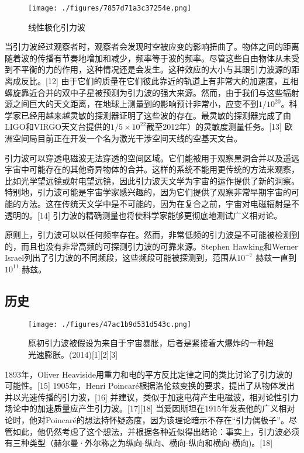 \begin{figure}[ht]
\centering
\texttt{[image: ./figures/7857d71a3c37254e.png]}
\caption{线性极化引力波} \label{fig_YLB_2}
\end{figure}

当引力波经过观察者时，观察者会发现时空被应变的影响扭曲了。物体之间的距离随着波的传播有节奏地增加和减少，频率等于波的频率。尽管这些自由物体从未受到不平衡的力的作用，这种情况还是会发生。这种效应的大小与其跟引力波源的距离成反比。[12] 由于它们的质量在它们彼此靠近的轨道上有非常大的加速度，互相螺旋靠近合并的双中子星被预测为引力波的强大来源。然而，由于我们与这些辐射源之间巨大的天文距离，在地球上测量到的影响预计非常小，应变不到$1/10^{20}$。科学家已经用越来越灵敏的探测器证明了这些波的存在。最灵敏的探测器完成了由LIGO和VIRGO天文台提供的$1/{5 \times 10^{22}}$截至2012年）的灵敏度测量任务。[13] 欧洲空间局目前正在开发一个名为激光干涉空间天线的空基天文台。

引力波可以穿透电磁波无法穿透的空间区域。它们能被用于观察黑洞合并以及遥远宇宙中可能存在的其他奇异物体的合并。这样的系统不能用更传统的方法来观察，比如光学望远镜或射电望远镜，因此引力波天文学为宇宙的运作提供了新的洞察。特别地，引力波可能是宇宙学家感兴趣的，因为它们提供了观察非常早期宇宙的可能的方法。这在传统天文学中是不可能的，因为在复合之前，宇宙对电磁辐射是不透明的。[14] 引力波的精确测量也将使科学家能够更彻底地测试广义相对论。

原则上，引力波可以以任何频率存在。然而，非常低频的引力波是不可能被检测到的，而且也没有非常高频的可探测引力波的可靠来源。Stephen Hawking和Werner Israel列出了引力波的不同频段，这些频段可能被探测到，范围从$ 10^{-7}$ 赫兹一直到$ 10^{11}$ 赫兹。

\subsection{历史}

\begin{figure}[ht]
\centering
\texttt{[image: ./figures/47ac1b9d531d543c.png]}
\caption{原初引力波被假设为来自于宇宙暴胀，后者是紧接着大爆炸的一种超光速膨胀。(2014)[1][2][3]} \label{fig_YLB_3}
\end{figure}

1893年，Oliver Heaviside用重力和电的平方反比定律之间的类比讨论了引力波的可能性。[15] 1905年，Henri Poincaré根据洛伦兹变换的要求，提出了从物体发出并以光速传播的引力波，[16] 并建议，类似于加速电荷产生电磁波，相对论性引力场论中的加速质量应产生引力波。[17][18] 当爱因斯坦在1915年发表他的广义相对论时，他对Poincaré的想法持怀疑态度，因为该理论暗示不存在“引力偶极子”。尽管如此，他仍然考虑了这个想法，并根据各种近似得出结论：事实上，引力波必须有三种类型（赫尔曼·外尔称之为纵向-纵向、横向-纵向和横向-横向)。[18]

